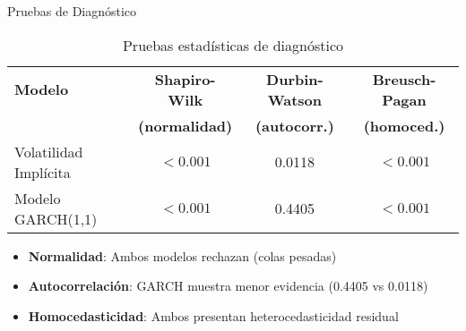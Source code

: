 \begin{frame}{Pruebas de Diagnóstico}
    \begin{table}
        \centering
        \begin{tabular}{lccc}
            \toprule
            \textbf{Modelo} & \textbf{Shapiro-Wilk} & \textbf{Durbin-Watson} & \textbf{Breusch-Pagan} \\
            & \textbf{(normalidad)} & \textbf{(autocorr.)} & \textbf{(homoced.)} \\
            \midrule
            Volatilidad Implícita & $< 0.001$ & 0.0118 & $< 0.001$ \\
            Modelo GARCH(1,1) & $< 0.001$ & 0.4405 & $< 0.001$ \\
            \bottomrule
        \end{tabular}
        \caption{Pruebas estadísticas de diagnóstico}
    \end{table}
    
    \vspace{0.5em}
    
    \begin{itemize}
        \item<2-> \textbf{Normalidad}: Ambos modelos rechazan (colas pesadas)
        \item<3-> \textbf{Autocorrelación}: GARCH muestra menor evidencia (0.4405 vs 0.0118)
        \item<4-> \textbf{Homocedasticidad}: Ambos presentan heterocedasticidad residual
    \end{itemize}
\end{frame}